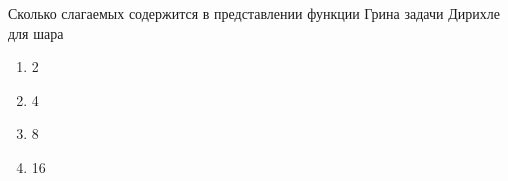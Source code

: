 Сколько слагаемых содержится в представлении функции Грина задачи Дирихле для шара

\begin{enumerate}[label=\arabic*)]
    \item 2
    \item 4
    \item 8
    \item 16
\end{enumerate}

